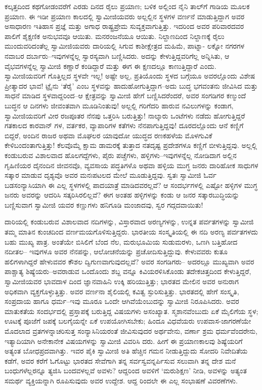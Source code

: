 ಕಲ್ಕತ್ತದಿಂದ ಕಥಗೋಡಂವರೆಗೆ ಎರಡು ದಿನದ ರೈಲು ಪ್ರಯಾಣ; ಬಳಿಕ ಅಲ್ಲಿಂದ ನೈನಿ ತಾಲ್​ಗೆ ಗಾಡಿಯ ಮೂಲಕ ಪ್ರಯಾಣ. ಈ ಇಡೀ ಪ್ರಯಾಣ ಕಾಲದಲ್ಲಿ ಸ್ವಾಮೀಜಿಯವರು ಅಲ್ಲಲ್ಲಿನ ಸ್ಥಳಗಳ ವರ್ಣನೆ ಮಾಡುತ್ತಿದ್ದಾಗ ಅವರ ಅಸಾಧಾರಣ ಇತಿಹಾಸ ಪ್ರಜ್ಞೆ ಮತ್ತು ಅಗಾಧ ರಾಷ್ಟ್ರಪ್ರೇಮ ಸುವ್ಯಕ್ತವಾಗುತ್ತಿತ್ತು. ಇದರಿಂದ ಅವರ ಪರಿವಾರದವರ ಪಾಲಿಗೆ ಶೈಕ್ಷಣಿಕ ಅನುಭವವೂ ಆಯಿತು. ಮನರಂಜನೆಯೂ ಆಯಿತು. ನಿಲ್ದಾಣದಿಂದ ನಿಲ್ದಾಣಕ್ಕೆ ರೈಲು ಮುಂದುವರಿದಂತೆಲ್ಲ ಸ್ವಾಮೀಜಿಯವರು ದಾರಿಯಲ್ಲಿ ಸಿಗುವ ಕಾಶೀಕ್ಷೇತ್ರದ ಮಹಿಮೆ, ಪಾಟ್ನಾ- ಲಕ್ನೋ ನಗರಗಳ ನವಾಬರ ದರ್ಬಾರು–ಇವುಗಳನ್ನೆಲ್ಲ ಸ್ವಾರಸ್ಯವಾಗಿ ಬಣ್ಣಿಸಿದರು. ಅದನ್ನು ಕೇಳುತ್ತಿದ್ದವರಿಗೆಲ್ಲ ಅನ್ನಿಸಿತು, ಆ ವೈಭವಗಳನ್ನೆಲ್ಲ ಸ್ವಾಮೀಜಿ ಕಣ್ಣಾರೆ ಕಂಡಿದ್ದಾರೆ ಮತ್ತು ಈಗ ಈ ಕ್ಷಣದಲ್ಲೂ ಕಾಣುತ್ತಿದ್ದಾರೆ ಎಂದು. ಸ್ವಾಮೀಜಿಯವರಿಗೆ ಗೊತ್ತಿಲ್ಲದ ಸ್ಥಳವೇ ಇಲ್ಲ! ಅಷ್ಟೇ ಅಲ್ಲ, ಪ್ರತಿಯೊಂದು ಸ್ಥಳದ ಬಗ್ಗೆಯೂ ಅವರಲ್ಲೊಂದು ವಿಶೇಷ ಪ್ರೀತ್ಯಾದರ ಭಾವ! ಟ್ರೈನು ‘ತೆರೈ’ ಎಂಬ ಸ್ಥಳವನ್ನು ಹಾದುಹೋಗುತ್ತಿದ್ದಾಗ–ಅದು ಬುದ್ಧ ಭಗವಂತನು ಜೀವಿಸಿದ ಮತ್ತು ಸಾಧನೆ ಮಾಡಿದ ಸ್ಥಳವಾದ್ದರಿಂದ–ಆ ಕ್ಷೇತ್ರವನ್ನು ಸ್ವಾಮೀಜಿ ಹೇಗೆ ಬಣ್ಣಿಸಿದರೆಂದರೆ, ಅವರ ಸಂಗಡಿಗರ ಕಣ್ಮುಂದೆ ಬುದ್ಧನ ಆ ದಿನಗಳು ಜೀವಂತವಾಗಿ ಮೂಡಿನಿಂತುವು! ಅಲ್ಲಲ್ಲಿ ಗರಿಗೆದರಿ ಹಾರುವ ನವಿಲುಗಳನ್ನು ಕಂಡಾಗ, ಸ್ವಾಮೀಜಿಯವರಿಗೆ ವೀರ ರಜಪೂತರ ನೆನಪು ಒತ್ತರಿಸಿ ಬರುತ್ತಿತ್ತು! ನಾಲ್ಕಾರು ಒಂಟೆಗಳು ನಡೆದು ಹೋಗುತ್ತಿದ್ದರೆ ಗತಕಾಲದ ಕಾರವಾನ್ ಗಳ, ವರ್ತಕರ, ವ್ಯಾಪಾರಿಗಳ ಕತೆಗಳು ನೆನಪಾಗುತ್ತಿದ್ದವು! ದೂರದಲ್ಲೊಂದು ಆನೆ ಕಣ್ಣಿಗೆ ಬಿದ್ದರೆ, ಅಂದಿನ ರಾಜರ ಅಥವಾ ಮೊಘಲರ ಯಾವುದೋ ಯುದ್ಧದ ರಣಕಹಳೆಯ ಮೊಳಗುವಿಕೆ ಕೇಳಿಬಂದಂತಾಗುತ್ತಿತ್ತು! ಕೆಲವೊಮ್ಮೆ ಕ್ಷಾಮ ಡಾಮರಕ್ಕೆ ತುತ್ತಾದ ನತದೃಷ್ಟ ಪ್ರದೇಶಗಳೂ ಕಣ್ಣಿಗೆ ಬೀಳುತ್ತಿದ್ದವು. ಅಲ್ಲಲ್ಲಿ ಕಂಡುಬರುವ ವಿಶಾಲವಾದ ಹೊಲಗದ್ದೆಗಳು, ಪೈರು ಪಚ್ಚೆಗಳು, ಹಳ್ಳಿಗಳು–ಇವುಗಳನ್ನೆಲ್ಲ ನೋಡಿದಾಗ ಅಲ್ಲಿನ ಗೃಹಿಣಿಯರ ದೈನಂದಿನ ಜೀವನವೊ, ವ್ಯವಸಾಯ ಪದ್ಧತಿಗಳೊ ಅಥವಾ ಹಳ್ಳಿಯ ಮುಗ್ಧ ಜನರು ದಾರಿಹೋಕ ಸಾಧುಗಳ ಸತ್ಕಾರ ಮಾಡುವ ದೃಶ್ಯವೊ ಅವರ ಮನಃಪಟಲದ ಮೇಲೆ ಮೂಡುತ್ತಿದ್ದವು. ಸ್ವತಃ ಸ್ವಾಮೀಜಿ ಓರ್ವ ಬಡಸಂನ್ಯಾಸಿಯಾಗಿ ಈ ಎಲ್ಲ ಸ್ಥಳಗಳಲ್ಲಿ ಪಾದಯಾತ್ರೆ ಮಾಡಿದವರಲ್ಲವೆ? ಆ ಸಂದರ್ಭಗಳಲ್ಲಿ ಎಷ್ಟೋ ಹಳ್ಳಿಗಳ ಮುಗ್ಧ ಜನರು ಅವರನ್ನು ಆದರಿಸಿ ಸತ್ಕರಿಸಿರಲಿಲ್ಲವೆ? ಈಗ ಅಂತಹ ಹಳ್ಳಿಗಳನ್ನು ಕಂಡು ಆ ಜನರ ಸತ್ಕಾರಬುದ್ಧಿಯನ್ನು ಬಣ್ಣಿಸುವಾಗ ಸ್ವಾಮೀಜಿ ಯವರ ಕಣ್ಣುಗಳು ಹನಿಗೂಡಿ ಮಂಜಾದವು, ಸ್ವರ ಗದ್ಗದವಾಯಿತು!

ದಾರಿಯಲ್ಲಿ ಕಂಡುಬರುವ ವಿಶಾಲವಾದ ನದಿಗಳನ್ನು, ವಿಸ್ತಾರವಾದ ಅರಣ್ಯಗಳನ್ನು, ಉನ್ನತ ಪರ್ವತಗಳನ್ನು ಸ್ವಾಮೀಜಿ ತಮ್ಮ ಮಾತಿನ ಕುಂಚದಿಂದ ವರ್ಣಮಯಗೊಳಿಸುತ್ತಿದ್ದರು. ಭಾರತೀಯ ಸಂಸ್ಕೃತಿಯಲ್ಲಿ ಈ ನದಿ ಅರಣ್ಯ ಪರ್ವತಗಳದು ಬಹು ಮುಖ್ಯ ಪಾತ್ರ. ಅಂತೆಯೇ ಬಿಸಿಲಿಗೆ ಬೆಂದ ನೆಲ, ಮರುಭೂಮಿಯ ಸುಡುಮರಳು, ಒಣಗಿ ಬತ್ತಿಹೋದ ನದೀತಲ– ಇವುಗಳೂ ಅವರ ನೆನಪನ್ನು, ಆಲೋಚನೆಯನ್ನು ಪ್ರಚೋದಿಸುತ್ತಿದ್ದುವು. ಕೇಳುವವರು ಕುತೂ ಹಲಿಗಳಾಗಿದ್ದರೆ ಹೇಳುವವರ ಕೌಶಲ ದ್ವಿಗುಣವಾಗುವುದಲ್ಲವೆ? ಅವರ ಸಂಗಡಿಗರು– ಅದರಲ್ಲೂ ಮುಖ್ಯವಾಗಿ ಅವರ ಪಾಶ್ಚಾತ್ಯ ಶಿಷ್ಯೆಯರು–ಅವರಾಡುವ ಒಂದೊಂದು ಶಬ್ದ ವನ್ನೂ ಕಿವಿಯರಳಿಸಿಕೊಂಡು ತದೇಕಚಿತ್ತದಿಂದ ಕೇಳುತ್ತಿದ್ದರೆ, ಸ್ವಾಮೀಜಿಯವರ ಭಾವದಾಳ ದಿಂದ ಜ್ಞಾನವಾಹಿನಿ ಉಕ್ಕಿ ಹರಿಯುತ್ತಿತ್ತು; ಭಾರತದ ಮೇಲಿನ ಅವರ ಅನುರಾಗ ಅಧಿಕವಾಗಿ ವ್ಯಕ್ತಗೊಳ್ಳುತ್ತಿತ್ತು. ಅವರ ವರ್ಣನಾ ಶೈಲಿಯಲ್ಲಿ ಕವಿತ್ವ ಸ್ಫುರಿಸುತ್ತಿತ್ತು. ಭಾರತದಲ್ಲಿ ಹೇಗೆ ಸಂಸ್ಕೃತಿ, ಸಂಪ್ರದಾಯ ಹಾಗೂ ಧರ್ಮ–ಇವು ಮೂರೂ ಒಂದೇ ಆಗಿವೆಯೆಂಬುದನ್ನು ಸ್ವಾಮೀಜಿ ನಿರೂಪಿಸಿದರು. ಅವರ ಮಾತುಕತೆಯ ಸಂದರ್ಭದಲ್ಲಿ ಪ್ರಸ್ತಾಪಕ್ಕೆ ಬರುತ್ತಿದ್ದ ವಿಷಯಗಳು ಅಸಂಖ್ಯಾತ. ಸ್ಮಶಾನವೆಂಬುದು ಏಕೆ ಮೈಲಿಗೆಯ ಸ್ಥಳ; ಊಟಕ್ಕೆ ಪೂಜೆಗೆ ಜಪಕ್ಕೆ ಬಲಗೈಯನ್ನೇ ಏಕೆ ಉಪಯೋಗಿಸಬೇಕು; ಹಿಂದೂ ವಿಧವೆಯರು ಉಪವಾಸ-ಜಾಗರಣೆಯೇ ಮೊದಲಾದ ವ್ರತಗಳನ್ನಾಚರಿಸುತ್ತ ಸಂನ್ಯಾಸಿನಿಯರಂತೆ ಜೀವಿಸುವುದರ ಅರ್ಥವೇನು, ವರ್ಣಾ ಶ್ರಮ ಧರ್ಮವೆಂದರೇನು, ಇತ್ಯಾದಿಯಾಗಿ ಅನೇಕಾನೇಕ ವಿಷಯಗಳನ್ನು ಸ್ವಾಮೀಜಿ ವಿವರಿಸಿ ದರು. ಹೀಗೆ ಈ ಪ್ರಯಾಣಕಾಲವು ಶಿಷ್ಯೆಯರಿಗೆ ಅತ್ಯಂತ ಬೋಧಪ್ರದವಾಗಿತ್ತು. ಇವರ ಪೈಕಿ ಸ್ವಾಮೀಜಿ ಅತಿ ಹೆಚ್ಚಿನ ಗಮನ ನೀಡುತ್ತಿದ್ದುದು ಸೋದರಿ ನಿವೇದಿತೆಯ ಕಡೆಗೆ, ಅವರ ಕರೆಗೆ ಓಗೊಟ್ಟು ಭಾರತದ ಸೇವೆಗಾಗಿ ತನ್ನ ಸರ್ವಸ್ವವನ್ನರ್ಪಿಸುವ ಸಲುವಾಗಿ ತನ್ನ ದೇಶ ಮನೆ ಬಂಧುಗಳೆಲ್ಲರನ್ನೂ ತ್ಯಜಿಸಿ ಬಂದವಳಲ್ಲವೆ ಅವಳು? ಆದ್ದರಿಂದ ಅವಳಿಗೆ ‘ಮರುಶಿಕ್ಷಣ’ ನೀಡಿ, ಅವಳನ್ನು ಅತ್ಯಂತ ಸಮರ್ಥ ವ್ಯಕ್ತಿಯನ್ನಾಗಿ ರೂಪಿಸುವುದು ಅವರ ಉದ್ದೇಶ. ಆದ್ದ ರಿಂದಲೇ ಈ ಎಲ್ಲ ಸಂಭಾಷಣೆ ವಿವರಣೆಗಳು.

